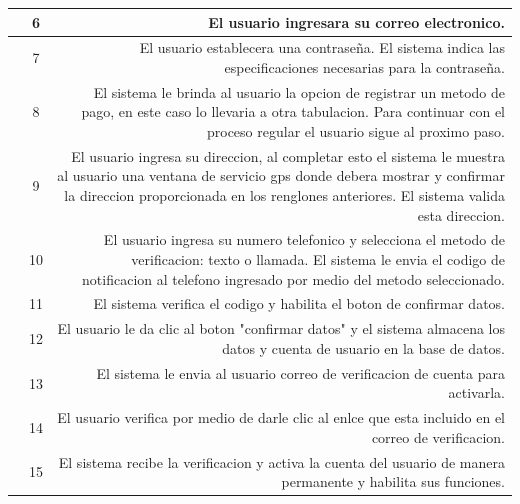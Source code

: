 \documentclass[conference]{IEEEtran}
\begin{document}
\begin{table}[H]
\begin{adjustbox}{width=0.45\textwidth}
\begin{tabular}{|p{11.215em}|r|r|}
    \midrule
    \multicolumn{1}{|r|}{} & \multicolumn{1}{c|}{6} & \multicolumn{1}{p{32em}|}{El usuario ingresara su correo electronico.} \\
    \midrule
    \multicolumn{1}{|r|}{} & \multicolumn{1}{c|}{7} & \multicolumn{1}{p{32em}|}{El usuario establecera una contraseña. El sistema indica las especificaciones necesarias para la contraseña.} \\
    \midrule
    \multicolumn{1}{|r|}{} & \multicolumn{1}{c|}{8} & \multicolumn{1}{p{32em}|}{El sistema le brinda al usuario la opcion de registrar un metodo de pago, en este caso lo llevaria a otra tabulacion. Para continuar con el proceso regular el usuario sigue al proximo paso.} \\
    \midrule
    \multicolumn{1}{|r|}{} & \multicolumn{1}{c|}{9} & \multicolumn{1}{p{32em}|}{El usuario ingresa su direccion, al completar esto el sistema le muestra al usuario una ventana de servicio gps donde debera mostrar y confirmar la direccion proporcionada en los renglones anteriores. El sistema valida esta direccion.} \\
    \midrule
    \multicolumn{1}{|r|}{} & \multicolumn{1}{c|}{10} & \multicolumn{1}{p{32em}|}{El usuario ingresa su numero telefonico y selecciona el metodo de verificacion: texto o llamada. El sistema le envia el codigo de notificacion al telefono ingresado por medio del metodo seleccionado.} \\
    \midrule
    \multicolumn{1}{|r|}{} & \multicolumn{1}{c|}{11} & \multicolumn{1}{p{32em}|}{El sistema verifica el codigo y habilita el boton de confirmar datos.} \\
    \midrule
    \multicolumn{1}{|r|}{} & \multicolumn{1}{c|}{12} & \multicolumn{1}{p{32em}|}{El usuario le da clic al boton "confirmar datos" y el sistema almacena los datos y cuenta de usuario en la base de datos.} \\
    \midrule
    \multicolumn{1}{|r|}{} & \multicolumn{1}{c|}{13} & \multicolumn{1}{p{32em}|}{El sistema le envia al usuario correo de verificacion de cuenta para activarla.} \\
    \midrule
    \multicolumn{1}{|r|}{} & \multicolumn{1}{c|}{14} & \multicolumn{1}{p{32em}|}{El usuario verifica por medio de darle clic al enlce que esta incluido en el correo de verificacion.} \\
    \midrule
    \multicolumn{1}{|r|}{} & \multicolumn{1}{c|}{15} & \multicolumn{1}{p{32em}|}{El sistema recibe la verificacion y activa la cuenta del usuario de manera permanente y habilita sus funciones.} \\

\end{tabular}
\end{adjustbox}
\end{table}
\end{document}
